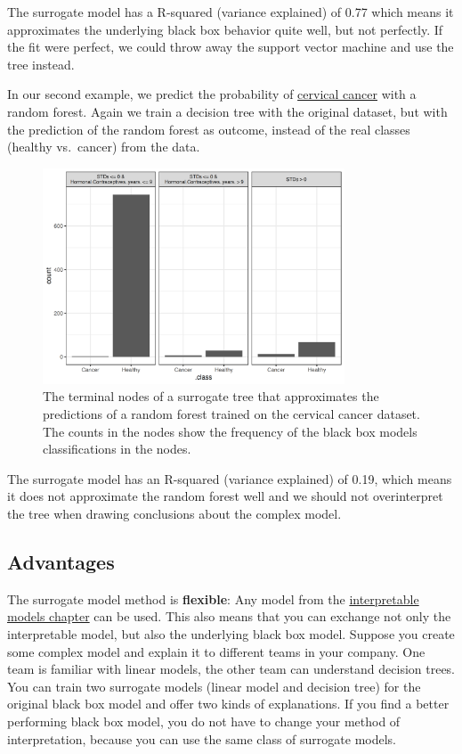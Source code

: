 \documentclass[
  11pt,
]{scrbook}
\begin{document}
The surrogate model has a R-squared (variance explained) of 0.77 which means it approximates the underlying black box behavior quite well, but not perfectly.
If the fit were perfect, we could throw away the support vector machine and use the tree instead.

In our second example, we predict the probability of \protect\hyperlink{cervical}{cervical cancer} with a random forest.
Again we train a decision tree with the original dataset, but with the prediction of the random forest as outcome, instead of the real classes (healthy vs.~cancer) from the data.

\begin{figure}

{\centering \includegraphics[width=0.8\textwidth]{images/surrogate-cervical-1} 

}

\caption{The terminal nodes of a surrogate tree that approximates the predictions of a random forest trained on the cervical cancer dataset. The counts in the nodes show the frequency of the black box models classifications in the nodes.}\label{fig:surrogate-cervical}
\end{figure}

The surrogate model has an R-squared (variance explained) of 0.19, which means it does not approximate the random forest well and we should not overinterpret the tree when drawing conclusions about the complex model.

\hypertarget{advantages-10}{%
\subsection{Advantages}\label{advantages-10}}

The surrogate model method is \textbf{flexible}:
Any model from the \protect\hyperlink{simple}{interpretable models chapter} can be used.
This also means that you can exchange not only the interpretable model, but also the underlying black box model.
Suppose you create some complex model and explain it to different teams in your company.
One team is familiar with linear models, the other team can understand decision trees.
You can train two surrogate models (linear model and decision tree) for the original black box model and offer two kinds of explanations.
If you find a better performing black box model, you do not have to change your method of interpretation, because you can use the same class of surrogate models.
\end{document}
